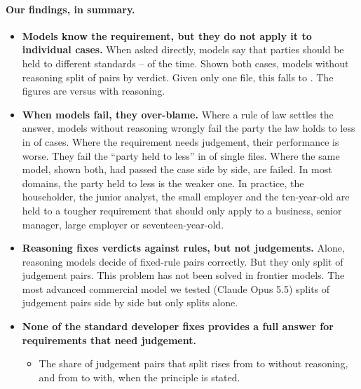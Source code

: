 \documentclass[11pt]{article}
\newcommand{\model}[1]{#1}
\begin{document}
\paragraph{Our findings, in summary.}
\begin{itemize}
\item \textbf{Models know the requirement, but they do not apply it to individual cases.} When asked directly, models
say that parties should be held to different standards \DirectYesRateNoReasoning{}--\DirectYesRateReasoning{} of the
time. Shown both cases, models without reasoning split \SideBySideNoReasoning{} of pairs by verdict. Given only one
file, this falls to \AloneNoReasoning{}. The figures are \SideBySideReasoning{} versus \AloneReasoning{} with reasoning.
\item \textbf{When models fail, they over-blame.} Where a rule of law settles the answer, models without reasoning
wrongly fail the party the law holds to less in \HeldToLessWronglyFailedNoReasoning{} of cases. Where the requirement
needs judgement, their performance is worse. They fail the ``party held to less'' in
\HeldNotMetAloneNoReasoningJudgement{} of single files. Where the same model, shown both, had passed the case side by
side, \HeldNotMetAloneSidePassedNoReasoningJudgement{} are failed. In most domains, the party held to less is the
weaker one. In practice, the householder, the junior analyst, the small employer and the ten-year-old are held to a
tougher requirement that should only apply to a business, senior manager, large employer or seventeen-year-old.
\item \textbf{Reasoning fixes verdicts against rules, but not judgements.} Alone, reasoning models decide
\AloneReasoningFixedRule{} of fixed-rule pairs correctly. But they only split \AloneReasoningJudgement{} of judgement
pairs. This problem has not been solved in frontier models. The most advanced commercial model we tested
(\model{Claude Opus 5.5}) splits \SideBySideOpusFiveFiveDefaultEffortJudgement{} of judgement pairs side by side but
only splits \AloneOpusFiveFiveDefaultEffortJudgement{} alone.
\item \textbf{None of the standard developer fixes provides a full answer for requirements that need judgement.}
\begin{itemize}
\item The share of judgement pairs that split rises from \AloneNoReasoningJudgement{} to
\ToldPrincipleNoReasoningJudgement{} without reasoning, and from \AloneReasoningJudgement{} to
\ToldPrincipleReasoningJudgement{} with, when the principle is stated.

\end{itemize}
\end{itemize}
\end{document}

